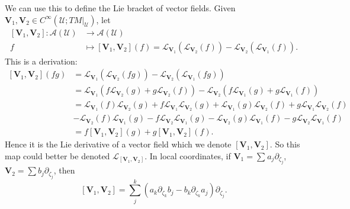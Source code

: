 \begin{example}
  We can use this to define the Lie bracket of vector fields. Given $\mathbf{V}_1,\mathbf{V}_2 \in C^{\infty}\left( \mathcal{U};TM|_{\mathcal{U}} \right) $, let 
  \begin{align*}
    \left[ \mathbf{V}_1,\mathbf{V}_2 \right] : \mathcal{A}\left( \mathcal{U} \right)  &\longrightarrow \mathcal{A}\left( \mathcal{U} \right)  \\
    f &\longmapsto \left[ \mathbf{V}_1,\mathbf{V}_2 \right] (f)=\mathcal{L}_{\mathbf{V}_1}\left( \mathcal{L}_{\mathbf{V}_2}(f) \right) -\mathcal{L}_{\mathbf{V}_2}\left( \mathcal{L}_{\mathbf{V}_1}(f) \right) 
  .\end{align*}
  This is a derivation:
  \begin{align*}
    \left[ \mathbf{V}_1,\mathbf{V}_{2} \right] (fg)&= \mathcal{L}_{\mathbf{V}_1}\left( \mathcal{L}_{\mathbf{V}_2}(fg) \right) -\mathcal{L}_{\mathbf{V}_2}\left( \mathcal{L}_{\mathbf{V}_1}(fg) \right) \\
    &= \mathcal{L}_{\mathbf{V}_1}\left( f\mathcal{L}_{\mathbf{V}_2}(g)+g\mathcal{L}_{\mathbf{V}_2}(f) \right) -\mathcal{L}_{\mathbf{V}_2}\left( f\mathcal{L}_{\mathbf{V}_1}(g)+g\mathcal{L}_{\mathbf{V}_1}(f) \right) \\
    &=\mathcal{L}_{\mathbf{V}_1}(f)\mathcal{L}_{\mathbf{V}_2}(g)+f\mathcal{L}_{\mathbf{V}_1}\mathcal{L}_{\mathbf{V}_2}(g)+\mathcal{L}_{\mathbf{V}_1}(g)\mathcal{L}_{\mathbf{V}_2}(f)+g\mathcal{L}_{\mathbf{V}_1}\mathcal{L}_{\mathbf{V}_2}(f)\\
    &-\mathcal{L}_{\mathbf{V}_2}(f)\mathcal{L}_{\mathbf{V}_1}(g)-f\mathcal{L}_{\mathbf{V}_2}\mathcal{L}_{\mathbf{V}_1}(g)-\mathcal{L}_{\mathbf{V}_2}(g)\mathcal{L}_{\mathbf{V}_1}(f)-g\mathcal{L}_{\mathbf{V}_2}\mathcal{L}_{\mathbf{V}_1}(f)\\
    &=f\left[ \mathbf{V}_1,\mathbf{V}_2 \right](g) +g\left[ \mathbf{V}_1,\mathbf{V}_2 \right](f) 
  .\end{align*}
  Hence it is the Lie derivative of a vector field which we denote $\left[ \mathbf{V}_1,\mathbf{V}_2 \right] $. So this map could better be denoted $\mathcal{L}_{\left[ \mathbf{V}_1,\mathbf{V}_2 \right] }$. In local coordinates, if $\mathbf{V}_1=\sum_{}^{} a_j\partial_{\zeta _j}$, $\mathbf{V}_2=\sum b_j \partial_{\zeta _j}$, then 
  \[
    \left[ \mathbf{V}_1,\mathbf{V}_2 \right] =\sum_{j}^{k} \left( a_k\partial_{\zeta _k}b_j-b_k\partial_{\zeta _k}a_j \right) \partial_{\zeta _j}.
  \] 
\end{example}

